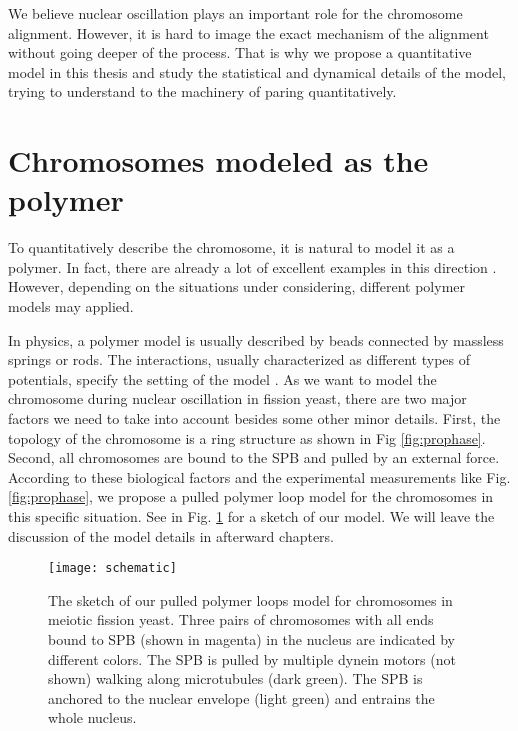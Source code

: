 We believe nuclear oscillation plays an important role for the chromosome alignment. However, it is hard to image the exact mechanism of the alignment without going deeper of the process. That is why we propose a quantitative model in this thesis and study the statistical and dynamical details of the model, trying to understand to the machinery of paring quantitatively. 


\section{Chromosomes modeled as the polymer}
To quantitatively describe the chromosome, it is natural to model it as a polymer. In fact, there are already a lot of excellent examples in this direction \cite{Wong2013,Tree2013,Halverson2014,Jun2010a}. However, depending on the situations under considering, different polymer models may applied. 

In physics, a polymer model is usually described by beads connected by massless springs or rods. The interactions, usually characterized as different types of potentials, specify the setting of the model \cite{Doi1988}. As we want to model the chromosome during nuclear oscillation in fission yeast, there are two major factors we need to take into account besides some other minor details. First, the topology of the chromosome is a ring structure as shown in Fig \ref{fig:prophase}. Second, all chromosomes are bound to the SPB and pulled by an external force. According to these biological factors and the experimental measurements like Fig. \ref{fig:prophase}, we propose a pulled polymer loop model for the chromosomes in this specific situation. See in Fig. \ref{fig:schematic} for a sketch of our model. We will leave the discussion of the model details in afterward chapters.

\begin{figure}[htpb]
    \centering
    \texttt{[image: schematic]}
    \caption{The sketch of our pulled polymer loops model for chromosomes in meiotic fission yeast. Three pairs of chromosomes with all ends bound to SPB (shown in magenta) in the nucleus are indicated by different colors.  The SPB is pulled by multiple dynein motors (not shown) walking along microtubules (dark green). The SPB is anchored to the nuclear envelope (light green) and entrains the whole nucleus.}
    \label{fig:schematic}
\end{figure}

